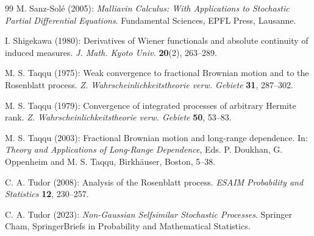 \documentclass[a4paper,10pt]{article}
\theoremstyle{definition}
\theoremstyle{plain}
\newcommand\1{\mathbbm{1}}
\begin{document}
\begin{thebibliography}{99}
\rm M. Sanz-Solé (2005):  
\rm {\it Malliavin Calculus: With Applications to Stochastic Partial Differential Equations}.  
\rm Fundamental Sciences, EPFL Press, Lausanne.

\rm I. Shigekawa (1980): 
\rm Derivatives of Wiener functionals and absolute continuity of induced measures.  
\rm {\it J. Math. Kyoto Univ.} {\bf 20}(2), 263--289.

\rm M. S. Taqqu (1975): 
\rm Weak convergence to fractional Brownian motion and to the Rosenblatt process.  
\rm {\it Z. Wahrscheinlichkeitstheorie verw. Gebiete} {\bf 31}, 287--302.

\rm M. S. Taqqu (1979):
\rm Convergence of integrated processes of arbitrary Hermite rank.
\rm {\it Z. Wahrscheinlichkeitstheorie verw. Gebiete} {\bf 50}, 53--83.

\rm M. S. Taqqu (2003): 
\rm Fractional Brownian motion and long-range dependence.  
In: {\it Theory and Applications of Long-Range Dependence}, 
Eds. P. Doukhan, G. Oppenheim and M. S. Taqqu, Birkh\"auser, Boston, 5--38.

\rm C. A. Tudor (2008): 
\rm Analysis of the Rosenblatt process.  
\rm {\it ESAIM Probability and Statistics} {\bf 12}, 230--257.

\rm C. A. Tudor (2023): 
\rm {\it Non-Gaussian Selfsimilar Stochastic Processes}.  
\rm Springer Cham, SpringerBriefs in Probability and Mathematical Statistics.

\end{thebibliography}
\end{document}
